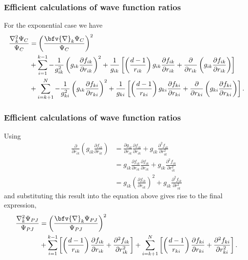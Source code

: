  {
   \frametitle{Efficient calculations of wave function ratios}
 \begin{small}
 {\scriptsize

For the exponential case we have
\begin{align*}
 \frac{\nabla_{k}^2 \Psi_{C}}{\Psi_{C}} & =  \left(\frac{\bfv{\nabla}_k \Psi_{C}}{\Psi_{C}}\right)^2 \nonumber\\
 & + \sum_{i=1}^{k-1} -\frac{1}{g_{ik}^2}\left(g_{ik}\frac{\partial f_{ik}}{\partial r_{ik}}\right)^2 + \frac{1}{g_{ik}}\left[\left(\frac{d-1}{r_{ik}}\right)g_{ik}\frac{\partial f_{ik}}{\partial r_{ik}} + \frac{\partial }{\partial r_{ik}}\left(g_{ik}\frac{\partial f_{ik}}{\partial r_{ik}}\right) \right]\nonumber\\
 & + \sum_{i=k+1}^{N} -\frac{1}{g_{ki}^2}\left(g_{ik}\frac{\partial f_{ki}}{\partial r_{ki}}\right)^2 + \frac{1}{g_{ki}}\left[\left(\frac{d-1}{r_{ki}}\right)g_{ki}\frac{\partial f_{ki}}{\partial r_{ki}} + \frac{\partial }{\partial r_{ki}}\left(g_{ki}\frac{\partial f_{ki}}{\partial r_{ki}}\right) \right].
 \end{align*}
 }
 \end{small}
 }\frame
 {
   \frametitle{Efficient calculations of wave function ratios}
 \begin{small}
 {\scriptsize

Using
\begin{align*}
 \frac{\partial }{\partial r_{ik}}\left(g_{ik}\frac{\partial f_{ik}}{\partial r_{ik}}\right) & = \frac{\partial g_{ik}}{\partial r_{ik}}\frac{\partial f_{ik}}{\partial r_{ik}} + g_{ik}\frac{\partial^2 f_{ik}}{\partial r_{ik}^2}\\
 & = g_{ik}\frac{\partial f_{ik}}{\partial r_{ik}}\frac{\partial f_{ik}}{\partial r_{ik}} + g_{ik}\frac{\partial^2 f_{ik}}{\partial r_{ik}^2}\\
 & = g_{ik}\left(\frac{\partial f_{ik}}{\partial r_{ik}}\right)^2 + g_{ik}\frac{\partial^2 f_{ik}}{\partial r_{ik}^2}
\end{align*}
and substituting this result into the equation above gives rise to the final expression,
\begin{align}\label{lapJasRatio}
\frac{\nabla_{k}^2 \Psi_{PJ}}{\Psi_{PJ}}  &=  \left(\frac{\bfv{\nabla}_k \Psi_{PJ}}{\Psi_{PJ}}\right)^2\nonumber\\
  &+ \sum_{i=1}^{k-1} \left[\left(\frac{d-1}{r_{ik}}\right)\frac{\partial f_{ik}}{\partial r_{ik}} + \frac{\partial^2  f_{ik}}{\partial r_{ik}^2} \right]
  + \sum_{i=k+1}^{N} \left[\left(\frac{d-1}{r_{ki}}\right)\frac{\partial f_{ki}}{\partial r_{ki}} + \frac{\partial^2 f_{ki}}{\partial r_{ki}^2} \right].
 \end{align}
 }
 \end{small}
 }


